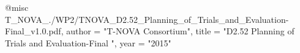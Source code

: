 @misc{ T_NOVA_./WP2/TNOVA_D2.52_Planning_of_Trials_and_Evaluation-Final_v1.0.pdf,
       author = "T-NOVA Consortium",
       title = "D2.52 Planning of Trials and Evaluation-Final ",
       year = "2015" }
